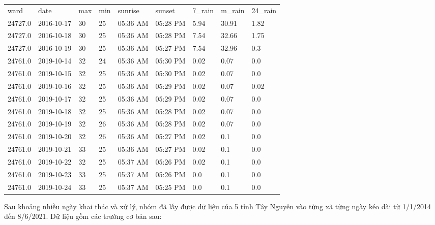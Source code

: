 \documentclass{article}
\begin{document}
\begin{table}[]
      \begin{tabular}{lllllllll}
            ward    & date       & max & min & sunrise  & sunset   & 7\_rain & m\_rain & 24\_rain \\
            24727.0 & 2016-10-17 & 30  & 25  & 05:36 AM & 05:28 PM & 5.94    & 30.91   & 1.82     \\
            24727.0 & 2016-10-18 & 30  & 25  & 05:36 AM & 05:28 PM & 7.54    & 32.66   & 1.75     \\
            24727.0 & 2016-10-19 & 30  & 25  & 05:36 AM & 05:27 PM & 7.54    & 32.96   & 0.3      \\
            24761.0 & 2019-10-14 & 32  & 24  & 05:36 AM & 05:30 PM & 0.02    & 0.07    & 0.0      \\
            24761.0 & 2019-10-15 & 32  & 25  & 05:36 AM & 05:30 PM & 0.02    & 0.07    & 0.0      \\
            24761.0 & 2019-10-16 & 32  & 25  & 05:36 AM & 05:29 PM & 0.02    & 0.07    & 0.02     \\
            24761.0 & 2019-10-17 & 32  & 25  & 05:36 AM & 05:29 PM & 0.02    & 0.07    & 0.0      \\
            24761.0 & 2019-10-18 & 32  & 25  & 05:36 AM & 05:28 PM & 0.02    & 0.07    & 0.0      \\
            24761.0 & 2019-10-19 & 32  & 26  & 05:36 AM & 05:28 PM & 0.02    & 0.07    & 0.0      \\
            24761.0 & 2019-10-20 & 32  & 26  & 05:36 AM & 05:27 PM & 0.02    & 0.1     & 0.0      \\
            24761.0 & 2019-10-21 & 33  & 25  & 05:36 AM & 05:27 PM & 0.02    & 0.1     & 0.0      \\
            24761.0 & 2019-10-22 & 32  & 25  & 05:37 AM & 05:26 PM & 0.02    & 0.1     & 0.0      \\
            24761.0 & 2019-10-23 & 33  & 25  & 05:37 AM & 05:26 PM & 0.0     & 0.1     & 0.0      \\
            24761.0 & 2019-10-24 & 33  & 25  & 05:37 AM & 05:25 PM & 0.0     & 0.1     & 0.0
      \end{tabular}
\end{table}

Sau khoảng nhiều ngày khai thác và xử lý, nhóm đã lấy được dữ liệu của 5 tỉnh Tây Nguyên vào từng xã từng ngày kéo dài từ 1/1/2014 đến 8/6/2021. Dữ liệu gồm các trường cơ bản sau:
\end{document}
